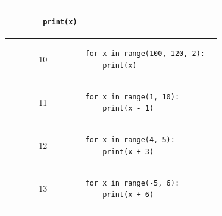 \documentclass[14pt]{extarticle}
\begin{document}
{\begin{longtable}{|c|p{}|p{}|}
\begin{pycell}
\begin{english}
\begin{verbatim}
        print(x)
\end{verbatim}
\end{english}
\end{pycell} & \rule{0pt}{1.3cm} \\
\hline
10 &
\begin{pycell}
\begin{english}
\begin{verbatim}
for x in range(100, 120, 2):
    print(x)
\end{verbatim}
\end{english}
\end{pycell} & \rule{0pt}{1.3cm} \\
\hline
11 &
\begin{pycell}
\begin{english}
\begin{verbatim}
for x in range(1, 10):
    print(x - 1)
\end{verbatim}
\end{english}
\end{pycell} & \rule{0pt}{1.3cm} \\
\hline
12 &
\begin{pycell}
\begin{english}
\begin{verbatim}
for x in range(4, 5):
    print(x + 3)
\end{verbatim}
\end{english}
\end{pycell} & \rule{0pt}{1.3cm} \\
\hline
13 &
\begin{pycell}
\begin{english}
\begin{verbatim}
for x in range(-5, 6):
    print(x + 6)
\end{verbatim}
\end{english}
\end{pycell} & \rule{0pt}{1.3cm} \\
\hline
\end{longtable}
}
\end{document}
